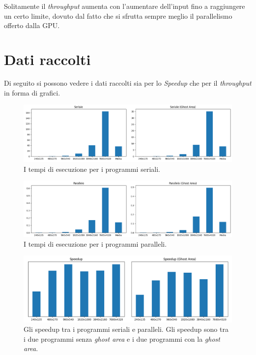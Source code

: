 \documentclass[12pt,a4paper,openright,twoside]{report}
\begin{document}
Solitamente il \textit{throughput} aumenta con l'aumentare dell'input fino a raggiungere un certo limite, dovuto dal fatto che si sfrutta sempre meglio il parallelismo offerto dalla GPU.

\section{Dati raccolti}

Di seguito si possono vedere i dati raccolti sia per lo \textit{Speedup} che per il \textit{throughput} in forma di grafici.

\begin{figure}[h]
    \centering
    \includegraphics[width=\textwidth]{graphs_serial.png}
    \caption{I tempi di esecuzione per i programmi seriali.}
    \label{img:times}
\end{figure}

\begin{figure}[h]
    \centering
    \includegraphics[width=\textwidth]{graphs_parallel.png}
    \caption{I tempi di esecuzione per i programmi paralleli.}
    \label{img:times}
\end{figure}

\begin{figure}[h]
    \centering
    \includegraphics[width=\textwidth]{speedup.png}
    \caption[Gli Gli speedup tra i programmi seriali e paralleli.]{Gli speedup tra i programmi seriali e paralleli. Gli speedup sono tra i due programmi senza \textit{ghost area} e i due programmi con la \textit{ghost area}.}
    \label{img:speedup}
\end{figure}
\end{document}
